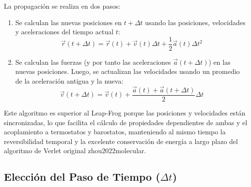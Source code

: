 La propagación se realiza en dos pasos:
\begin{enumerate}
    \item Se calculan las nuevas posiciones en $t+\Delta t$ usando las posiciones, velocidades y aceleraciones del tiempo actual $t$:
    \begin{equation}
    \vec{r}(t + \Delta t) = \vec{r}(t) + \vec{v}(t)\Delta t + \frac{1}{2}\vec{a}(t)\Delta t^2
    \label{eq:vv_pos}
    \end{equation}
    \item Se calculan las fuerzas (y por tanto las aceleraciones $\vec{a}(t+\Delta t)$) en las nuevas posiciones. Luego, se actualizan las velocidades usando un promedio de la aceleración antigua y la nueva:
    \begin{equation}
    \vec{v}(t + \Delta t) = \vec{v}(t) + \frac{\vec{a}(t) + \vec{a}(t + \Delta t)}{2}\Delta t
    \label{eq:vv_vel}
    \end{equation}
\end{enumerate}
Este algoritmo es superior al Leap-Frog porque las posiciones y velocidades están sincronizadas, lo que facilita el cálculo de propiedades dependientes de ambas y el acoplamiento a termostatos y barostatos, manteniendo al mismo tiempo la reversibilidad temporal y la excelente conservación de energía a largo plazo del algoritmo de Verlet original \cite[452, 28]{jensen2017introduction}{zhou2022molecular}.

\subsection{Elección del Paso de Tiempo ($\Delta t$)}

